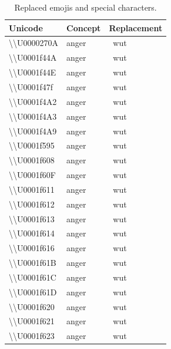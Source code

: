 \documentclass[
]{ccr}
\begin{document}
{
\begin{spacing}{.9}
\fontsize{7}{8}\selectfont 
\begin{longtable}[]{@{}
  >{\raggedright\arraybackslash}p{}
  >{\raggedright\arraybackslash}p{}
  >{\raggedright\arraybackslash}p{}@{}}
\caption{Replaced emojis and special characters.} \\
\toprule\noalign{}
\textbf{Unicode} & \textbf{Concept} & \textbf{Replacement} \\
\midrule\noalign{}
\endhead
\endlastfoot  
\textbackslash\textbackslash U0000270A & anger & ~wut \\
\textbackslash\textbackslash U0001f44A & anger & ~wut \\
\textbackslash\textbackslash U0001f44E & anger & ~wut \\
\textbackslash\textbackslash U0001f47f & anger & ~wut \\
\textbackslash\textbackslash U0001f4A2 & anger & ~wut \\
\textbackslash\textbackslash U0001f4A3 & anger & ~wut \\
\textbackslash\textbackslash U0001f4A9 & anger & ~wut \\
\textbackslash\textbackslash U0001f595 & anger & ~wut \\
\textbackslash\textbackslash U0001f608 & anger & ~wut \\
\textbackslash\textbackslash U0001f60F & anger & ~wut \\
\textbackslash\textbackslash U0001f611 & anger & ~wut \\
\textbackslash\textbackslash U0001f612 & anger & ~wut \\
\textbackslash\textbackslash U0001f613 & anger & ~wut \\
\textbackslash\textbackslash U0001f614 & anger & ~wut \\
\textbackslash\textbackslash U0001f616 & anger & ~wut \\
\textbackslash\textbackslash U0001f61B & anger & ~wut \\
\textbackslash\textbackslash U0001f61C & anger & ~wut \\
\textbackslash\textbackslash U0001f61D & anger & ~wut \\
\textbackslash\textbackslash U0001f620 & anger & ~wut \\
\textbackslash\textbackslash U0001f621 & anger & ~wut \\
\textbackslash\textbackslash U0001f623 & anger & ~wut \\

\end{longtable}
\end{spacing}}
\end{document}
